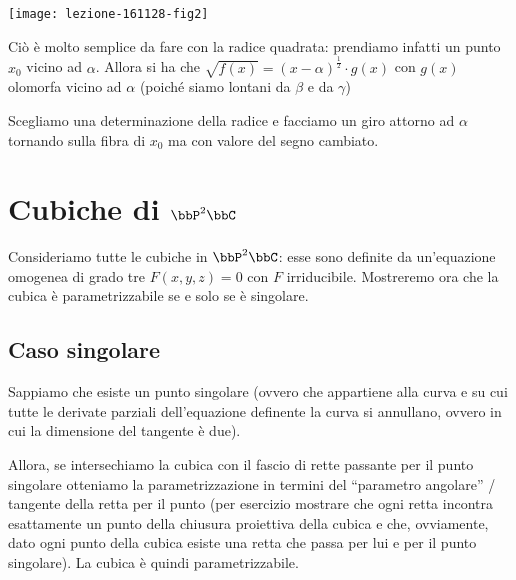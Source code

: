 \begin{center}
  \texttt{[image: lezione-161128-fig2]}
\end{center}

Ciò è molto semplice da fare con la radice quadrata: prendiamo infatti
un punto $x_0$ vicino ad $\alpha$. Allora si ha che
$\sqrt{f(x)} = (x - \alpha)^{\frac{1}{2}} \cdot g(x)$ con $g(x)$
olomorfa vicino ad $\alpha$ (poiché siamo lontani da $\beta$ e da
$\gamma$)

Scegliamo una determinazione della radice e facciamo un giro attorno ad
$\alpha$ tornando sulla fibra di $x_0$ ma con valore del segno cambiato.


\section{Cubiche di $\bbP^2\bbC$}
Consideriamo tutte le cubiche in $\bbP^2\bbC$: esse sono definite da
un'equazione omogenea di grado tre $F(x, y, z) = 0$ con $F$
irriducibile. Mostreremo ora che la cubica è parametrizzabile se e solo
se è singolare.


\subsection{Caso singolare}
Sappiamo che esiste un punto singolare (ovvero che appartiene alla curva
e su cui tutte le derivate parziali dell'equazione definente la curva si
annullano, ovvero in cui la dimensione del tangente è due).

Allora, se intersechiamo la cubica con il fascio di rette passante per
il punto singolare otteniamo la parametrizzazione in termini del
``parametro angolare'' / tangente della retta per il punto (per esercizio
mostrare che ogni retta incontra esattamente un punto della chiusura
proiettiva della cubica e che, ovviamente, dato ogni punto della cubica
esiste una retta che passa per lui e per il punto singolare). La cubica
è quindi parametrizzabile.

